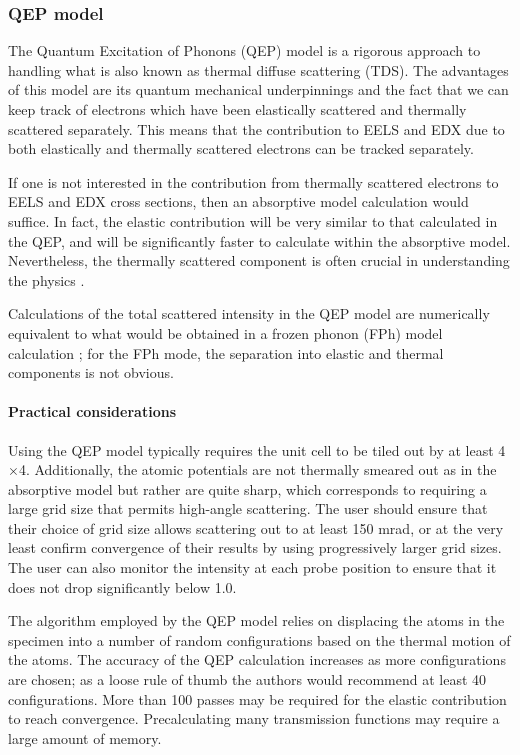\documentclass[12pt,a4paper]{article}
\newcommand{\by}{$\times$}
\begin{document}
\subsubsection{QEP model}
\label{sec:qep}


The Quantum Excitation of Phonons (QEP) model \cite{Forbes2010} is a rigorous approach to handling what is also known as thermal diffuse scattering (TDS).
The advantages of this model are its quantum mechanical underpinnings and the fact that we can keep track of electrons which have been elastically scattered and thermally scattered separately.
This means that the contribution to EELS and EDX due to both elastically and thermally scattered electrons can be tracked separately.

If one is not interested in the contribution from thermally scattered electrons to EELS and EDX cross sections, then an absorptive model calculation would suffice.
In fact, the elastic contribution will be very similar to that calculated in the QEP, and will be significantly faster to calculate within the absorptive model.
Nevertheless, the thermally scattered component is often crucial in understanding the physics \cite{Forbes2012}.

Calculations of the total scattered intensity in the QEP model are numerically equivalent to what would be obtained in a frozen phonon (FPh) model calculation \cite{LXS}; for the FPh mode, the separation into elastic and thermal components is not obvious.

\paragraph{Practical considerations}

Using the QEP model typically requires the unit cell to be tiled out by at least 4\by4.
Additionally, the atomic potentials are not thermally smeared out as in the absorptive model but rather are quite sharp, which corresponds to requiring a large grid size that permits high-angle scattering.
The user should ensure that their choice of grid size allows scattering out to at least 150 mrad, or at the very least confirm convergence of their results by using progressively larger grid sizes.
The user can also monitor the intensity at each probe position to ensure that it does not drop significantly below 1.0.

The algorithm employed by the QEP model relies on displacing the atoms in the specimen into a number of random configurations based on the thermal motion of the atoms.
The accuracy of the QEP calculation increases as more configurations are chosen; as a loose rule of thumb the authors would recommend at least 40 configurations.
More than 100 passes may be required for the elastic contribution to reach convergence.
Precalculating many transmission functions may require a large amount of memory.
\end{document}
